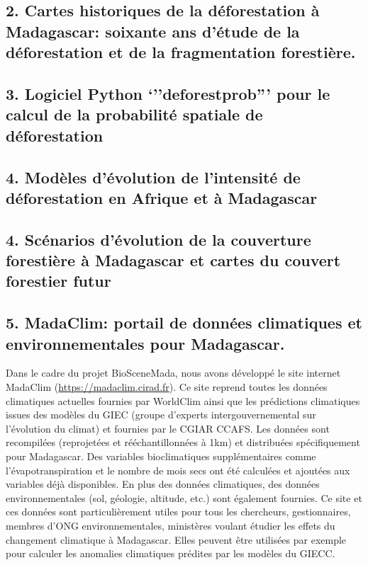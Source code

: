 \documentclass[]{article}
\begin{document}
\subsection{2. Cartes historiques de la déforestation à Madagascar:
soixante ans d'étude de la déforestation et de la fragmentation
forestière.}\label{cartes-historiques-de-la-deforestation-a-madagascar-soixante-ans-detude-de-la-deforestation-et-de-la-fragmentation-forestiere.}

\subsection{\texorpdfstring{3. Logiciel Python `''deforestprob''' pour
le calcul de la probabilité spatiale de
déforestation}{3. Logiciel Python ''deforestprob'' pour le calcul de la probabilité spatiale de déforestation}}\label{logiciel-python-deforestprob-pour-le-calcul-de-la-probabilite-spatiale-de-deforestation}

\subsection{4. Modèles d'évolution de l'intensité de déforestation en
Afrique et à
Madagascar}\label{modeles-devolution-de-lintensite-de-deforestation-en-afrique-et-a-madagascar}

\subsection{4. Scénarios d'évolution de la couverture forestière à
Madagascar et cartes du couvert forestier
futur}\label{scenarios-devolution-de-la-couverture-forestiere-a-madagascar-et-cartes-du-couvert-forestier-futur}

\subsection{5. MadaClim: portail de données climatiques et
environnementales pour
Madagascar.}\label{madaclim-portail-de-donnees-climatiques-et-environnementales-pour-madagascar.}

Dans le cadre du projet BioSceneMada, nous avons développé le site
internet MadaClim (\url{https://madaclim.cirad.fr}). Ce site reprend
toutes les données climatiques actuelles fournies par WorldClim ainsi
que les prédictions climatiques issues des modèles du GIEC (groupe
d'experts intergouvernemental sur l'évolution du climat) et fournies par
le CGIAR CCAFS. Les données sont recompilées (reprojetées et
rééchantillonnées à 1km) et distribuées spécifiquement pour Madagascar.
Des variables bioclimatiques supplémentaires comme l'évapotranspiration
et le nombre de mois secs ont été calculées et ajoutées aux variables
déjà disponibles. En plus des données climatiques, des données
environnementales (sol, géologie, altitude, etc.) sont également
fournies. Ce site et ces données sont particulièrement utiles pour tous
les chercheurs, gestionnaires, membres d'ONG environnementales,
ministères voulant étudier les effets du changement climatique à
Madagascar. Elles peuvent être utilisées par exemple pour calculer les
anomalies climatiques prédites par les modèles du GIECC.
\end{document}

